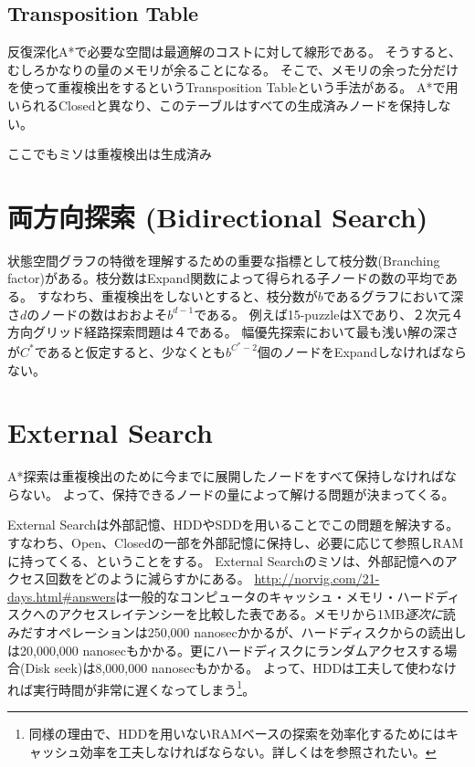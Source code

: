 \documentclass{report}
\begin{document}
\subsection{Transposition Table}

反復深化A*で必要な空間は最適解のコストに対して線形である。
そうすると、むしろかなりの量のメモリが余ることになる。
そこで、メモリの余った分だけを使って重複検出をするというTransposition Tableという手法がある。
A*で用いられるClosedと異なり、このテーブルはすべての生成済みノードを保持しない。

ここでもミソは重複検出は生成済み

\section{両方向探索 (Bidirectional Search)}
\label{sec:bidirectional-search}

状態空間グラフの特徴を理解するための重要な指標として枝分数(Branching factor)がある。枝分数はExpand関数によって得られる子ノードの数の平均である。
すなわち、重複検出をしないとすると、枝分数が$b$であるグラフにおいて深さ$d$のノードの数はおおよそ$b^{d-1}$である。
例えば15-puzzleはXであり、２次元４方向グリッド経路探索問題は４である。
幅優先探索において最も浅い解の深さが$C^*$であると仮定すると、少なくとも$b^{C^*-2}$個のノードをExpandしなければならない。



\section{External Search}

A*探索は重複検出のために今までに展開したノードをすべて保持しなければならない。
よって、保持できるノードの量によって解ける問題が決まってくる。

External Searchは外部記憶、HDDやSDDを用いることでこの問題を解決する。
すなわち、Open、Closedの一部を外部記憶に保持し、必要に応じて参照しRAMに持ってくる、ということをする。
External Searchのミソは、外部記憶へのアクセス回数をどのように減らすかにある。
\url{http://norvig.com/21-days.html#answers}は一般的なコンピュータのキャッシュ・メモリ・ハードディスクへのアクセスレイテンシーを比較した表である。メモリから1MB{\it 逐次に}読みだすオペレーションは250,000 nanosecかかるが、ハードディスクからの読出しは20,000,000 nanosecもかかる。更にハードディスクにランダムアクセスする場合(Disk seek)は8,000,000 nanosecもかかる。
よって、HDDは工夫して使わなければ実行時間が非常に遅くなってしまう\footnote{同様の理由で、HDDを用いないRAMベースの探索を効率化するためにはキャッシュ効率を工夫しなければならない。詳しくは\cite{burns2012implementing}を参照されたい。}。
\end{document}
